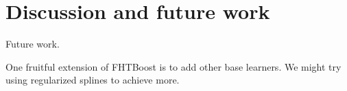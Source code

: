 \chapter{Discussion and future work}
\label{sec:discussion}
Future work.

One fruitful extension of FHTBoost is to add other base learners.
We might try using regularized splines to achieve more.